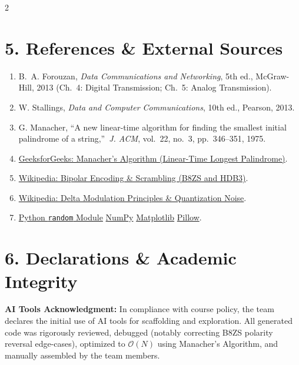 \documentclass[8.5pt,a4paper]{article}
\begin{document}
\begin{multicols}{2}
\section{5. References \& External Sources}
\begin{enumerate}
    \item B.~A. Forouzan, \textit{Data Communications and Networking}, 5th ed., McGraw-Hill, 2013 (Ch.~4: Digital Transmission; Ch.~5: Analog Transmission).
    \item W. Stallings, \textit{Data and Computer Communications}, 10th ed., Pearson, 2013.
    \item G. Manacher, \textquotedblleft A new linear-time algorithm for finding the smallest initial palindrome of a string,\textquotedblright\ \textit{J. ACM}, vol.~22, no.~3, pp.~346--351, 1975.
    \item \href{https://www.geeksforgeeks.org/manachers-algorithm-linear-time-longest-palindromic-substring-part-1/}{GeeksforGeeks: Manacher's Algorithm (Linear-Time Longest Palindrome)}.
    \item \href{https://en.wikipedia.org/wiki/Bipolar_encoding}{Wikipedia: Bipolar Encoding \& Scrambling (B8ZS and HDB3)}.
    \item \href{https://en.wikipedia.org/wiki/Delta_modulation}{Wikipedia: Delta Modulation Principles \& Quantization Noise}.
    \item \href{https://docs.python.org/3/library/random.html}{Python \texttt{random} Module} \quad\textbar\quad \href{https://numpy.org/doc/stable/}{NumPy} \quad\textbar\quad \href{https://matplotlib.org/stable/}{Matplotlib} \quad\textbar\quad \href{https://pillow.readthedocs.io/}{Pillow}.
\end{enumerate}

\section{6. Declarations \& Academic Integrity}
\textbf{AI Tools Acknowledgment:} In compliance with course policy, the team declares the initial use of AI tools for scaffolding and exploration. All generated code was rigorously reviewed, debugged (notably correcting B8ZS polarity reversal edge-cases), optimized to $\mathcal{O}(N)$ using Manacher's Algorithm, and manually assembled by the team members.

\end{multicols}
\end{document}
